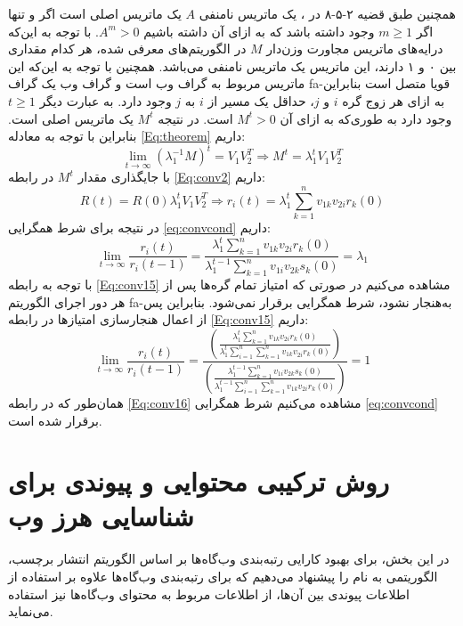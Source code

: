 \documentclass[twoside, a4paper,11pt]{book}
\numberwithin{equation}{chapter}
\numberwithin{table}{chapter}
\numberwithin{figure}{chapter}
\numberwithin{equation}{chapter}
\newcommand{\mls}[1]{\gls{fa-#1}\glsuseri{la-#1}}
\begin{document}
همچنین طبق قضیه ۲-۵-۸ در \cite{horn2012matrix}، یک ماتریس نامنفی $A$ یک ماتریس اصلی است اگر و تنها اگر $m\geq1$ وجود داشته باشد که به ازای آن داشته باشیم  $A^m>0$. با توجه به این‌که درایه‌های ماتریس مجاورت وزن‌دار $M$ در الگوریتم‌های معرفی شده، هر کدام مقداری بین ۰ و ۱ دارند، این ماتریس یک ماتریس نامنفی می‌باشد. همچنین با توجه به این‌که این ماتریس مربوط به گراف وب است و گراف وب یک گراف \mls{قویا متصل} است بنابراین به ازای هر زوج گره $i$ و $j$، حداقل یک مسیر از $i$ به $j$ وجود دارد. به عبارت دیگر $t\geq1$ وجود دارد به طوری‌که به ازای آن $M^t>0$ است. در نتیجه $M^t$ یک ماتریس اصلی است. بنابراین با توجه به معادله \ref{Eq:theorem} داریم:
\begin{equation}
\lim_{t \to \infty}(\lambda_1^{-1} M)^t = V_1 V_2^T   \Longrightarrow   M^t = \lambda_1^{t} V_1 V_2^T
	\label{Eq:conv7}
\end{equation}
با جایگذاری مقدار $M^t$ در رابطه \ref{Eq:conv2} داریم: 
\begin{equation}
R(t) = R(0) \lambda_1^{t} V_1{V_2^T}   \Longrightarrow   r_i(t) = \lambda_1^{t} \sum\limits_{k=1}^n {v_{1k}v_{2i} r_k(0)} 
	\label{Eq:conv10}
\end{equation}
در نتیجه برای شرط همگرایی \ref{eq:convcond} داریم:
\begin{equation}
\lim_{t \to \infty}\frac{r_i(t)}{r_i(t-1)} = \frac{\lambda_1^{t} \sum\limits_{k=1}^n {v_{1k} v_{2i} r_k(0)}}{\lambda_1^{t-1} \sum\limits_{k=1}^n {v_{1i} v_{2k} s_k(0)}} = \lambda_1 
	\label{Eq:conv15}
\end{equation}
با توجه به رابطه \ref{Eq:conv15} مشاهده می‌کنیم در صورتی‌ که امتیاز تمام گره‌ها پس از هر دور اجرای الگوریتم \mls{به‌هنجار} نشود، شرط همگرایی برقرار نمی‌شود. بنابراین پس از اعمال هنجار‌سازی امتیازها در رابطه \ref{Eq:conv15} داریم:
\begin{equation}
\lim_{t \to \infty}\frac{r_i(t)}{r_i(t-1)} = \frac{\left(\frac{\lambda_1^{t} \sum\limits_{k=1}^n {v_{1k} v_{2i} r_k(0)}} {\lambda_1^{t} \sum\limits_{i=1}^n \sum\limits_{k=1}^n {v_{1k} v_{2i} r_k(0)}}\right) }{\left(\frac{\lambda_1^{t-1} \sum\limits_{k=1}^n {v_{1i} v_{2k} s_k(0)}} {\lambda_1^{t-1} \sum\limits_{i=1}^n \sum\limits_{k=1}^n {v_{1k} v_{2i} r_k(0)}} \right) } = 1
	\label{Eq:conv16}
\end{equation}
همان‌طور که در رابطه \ref{Eq:conv16} مشاهده می‌کنیم شرط همگرایی \ref{eq:convcond} برقرار شده است.

\section{روش ترکیبی محتوایی و پیوندی برای شناسایی هرز وب}
\label{chapter:ٍcontentandlinkbased}
در این بخش، برای بهبود کارایی رتبه‌بندی وب‌گاه‌ها بر اساس الگوریتم انتشار برچسب، الگوریتمی به نام  را پیشنهاد می‌دهیم که برای رتبه‌بندی وب‌گاه‌ها علاوه بر استفاده از اطلاعات پیوندی بین آن‌ها، از اطلاعات مربوط به محتوای وب‌گاه‌ها نیز استفاده می‌نماید. 
\end{document}
